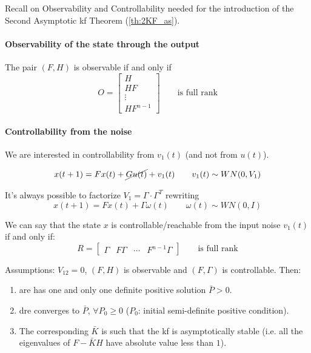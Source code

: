 \begin{recall}
    Recall on Observability and Controllability needed for the introduction of the Second Asymptotic \gls{kf} Theorem (\ref{th:2KF_as}). 

    \paragraph{Observability of the state through the output} 

    The pair $(F, H)$ is observable if and only if
    \[
        O = \begin{bmatrix}
            H \\
            HF \\
            \vdots \\
            HF^{n-1}
        \end{bmatrix}
        \qquad
        \text{is full rank}
    \]

    \paragraph{Controllability from the noise} 

    We are interested in controllability from $v_1(t)$ (and not from $u(t)$).

    \begin{align*}
        x(t+1) = Fx(t) + \cancel{Gu(t)} + v_1(t) \qquad v_1(t) \sim WN(0, V_1)
    \end{align*}


    It's always possible to factorize $V_1 = \Gamma\cdot\Gamma^T$ rewriting
    \[
        x(t+1) = Fx(t) + \Gamma\omega(t) \qquad \omega(t) \sim WN(0, I)
    \]

    We can say that the state $x$ is controllable/reachable from the input noise $v_1(t)$ if and only if:
    \[
        R = \begin{bmatrix}
            \Gamma & F\Gamma & \cdots & F^{n-1}\Gamma
        \end{bmatrix}
        \qquad
        \text{is full rank}
    \]
\end{recall}


\begin{theorem}\label{th:2KF_as}
    Assumptions: $V_{12} = 0$, $(F, H)$ is observable and $(F, \Gamma)$ is controllable.
    Then:
    \begin{enumerate}
        \item \gls{are} has one and only one definite positive solution $\bar{P} > 0$.
        \item \gls{dre} converges to $\bar{P}$, $\forall P_0 \ge 0$ ($P_0$: initial semi-definite positive condition).
        \item The corresponding $\bar{K}$ is such that the \gls{kf} is asymptotically stable (i.e. all the eigenvalues of $F-\bar{K}H$ have absolute value less than $1$).
    \end{enumerate}
\end{theorem}

